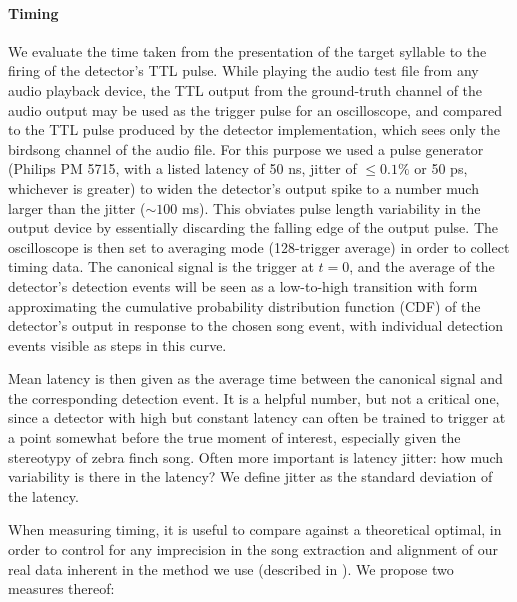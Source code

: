 \documentclass[10pt,letterpaper]{article}
\renewcommand{\subsubsection}[1]{\paragraph{#1}}
\begin{document}
\subsubsection{Timing}


We evaluate the time taken from the presentation of the target
syllable to the firing of the detector's TTL pulse. While playing the
audio test file from any audio playback device, the TTL output from
the ground-truth channel of the audio output may be used as the
trigger pulse for an oscilloscope, and compared to the TTL pulse
produced by the detector implementation, which sees only the birdsong
channel of the audio file. For this purpose we used a pulse generator
(Philips PM 5715, with a listed latency of 50 ns, jitter of $\leq
0.1\%$ or 50 ps, whichever is greater) to widen the detector's output
spike to a number much larger than the jitter ($\sim 100$ ms).  This
obviates pulse length variability in the output device by essentially
discarding the falling edge of the output pulse.  The oscilloscope is
then set to averaging mode (128-trigger average) in order to collect
timing data. The canonical signal is the trigger at $t=0$, and the
average of the detector's detection events will be seen as a
low-to-high transition with form approximating the cumulative
probability distribution function (CDF) of the detector's output in
response to the chosen song event, with individual detection events visible as steps in this curve.

%

Mean latency is then given as the average time between the 
canonical signal and the corresponding detection event. 
It is a helpful number, but not a critical one, since a
detector with high but constant latency can often be trained to
trigger at a point somewhat before the true moment of interest,
especially given the stereotypy of zebra finch song.  Often more
important is latency jitter: how much variability is there in the
latency?  We define jitter as the standard deviation of the latency.

When measuring timing, it is useful to compare against a theoretical
optimal, in order to control for any imprecision in the song
extraction and alignment of our real data inherent in the method we
use (described in \cite{Poole2012}).  We propose two measures thereof:
\end{document}
